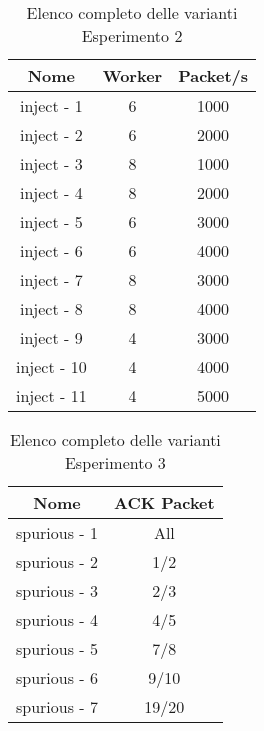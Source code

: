 \begin{table}[h!]
    \centering
    \caption*{Elenco completo delle varianti Esperimento 2}
    \begin{tabular}{|c|c|c|}
        \hline
        \textbf{Nome} & \textbf{Worker} & \textbf{Packet/s} \\
        \hline
        inject - 1 & 6 & 1000 \\
        \hline
        inject - 2 & 6 & 2000 \\
        \hline
        inject - 3 & 8 & 1000 \\
        \hline
        inject - 4 & 8 & 2000 \\
        \hline
        inject - 5 & 6 & 3000 \\
        \hline
        inject - 6 & 6 & 4000 \\
        \hline
        inject - 7 & 8 & 3000 \\
        \hline
        inject - 8 & 8 & 4000 \\
        \hline
        inject - 9 & 4 & 3000 \\
        \hline
        inject - 10 & 4 & 4000 \\
        \hline
        inject - 11 & 4 & 5000 \\
        \hline
    \end{tabular}
\end{table}

\begin{table}[h!]
    \centering
    \caption*{Elenco completo delle varianti Esperimento 3}
    \begin{tabular}{|c|c|}
        \hline
        \textbf{Nome} & \textbf{ACK Packet} \\
        \hline
        spurious - 1  & All \\
        \hline
        spurious - 2 & 1/2 \\
        \hline
        spurious - 3 & 2/3 \\
        \hline
        spurious - 4 & 4/5 \\
        \hline
        spurious - 5 & 7/8 \\
        \hline
        spurious - 6 & 9/10 \\
        \hline
        spurious - 7 & 19/20 \\
        \hline
    \end{tabular}
\end{table}

